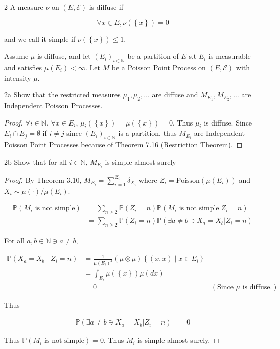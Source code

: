 \documentclass{article}
\newcommand*{\empset}{\emptyset}
\newcommand{\PR}{\mathbb{P}}
\newcommand{\N}{\mathbb{N}}
\newcommand{\Ec}[0]{\mathcal{E}}
\newcommand{\Poi}[0]{\text{Poisson}}
\begin{document}
\begin{PROB}{2}\label{Problem 2.}
    A measure $\nu$ on $(E, \Ec)$ is diffuse if 
    
    \[\forall x\in E, \nu(\left\{ x \right\}) = 0\]

    and we call it simple if $\nu(\left\{ x \right\}) \leq 1$. 

    Assume $\mu$ is diffuse, and let $(E_i)_{i \in \N}$ be a partition of $E$ s.t $E_i$ is measurable and satisfies $\mu(E_i) < \infty$. Let $M$ be a Poisson Point Process on $(E, \Ec)$ with intensity $\mu$. 
\end{PROB}
\begin{claim}{2a}\label{Claim 2a.}
    Show that the restricted measures $\mu_1, \mu_2, \dots$ are diffuse and $M_{E_1}, M_{E_2}, \dots$ are Independent Poisson Processes.  
\end{claim}
\begin{proof}
    $\forall i \in \N$, $\forall x \in E_i$, $\mu_i(\left\{ x \right\}) = \mu(\left\{ x \right\}) = 0$. Thus $\mu_i$ is diffuse. Since $E_i \cap E_j = \empset$ if $i \neq j$ since $(E_i)_{i \in \N}$ is a partition, thus $M_{E_i}$ are Independent Poisson Point Processes because of Theorem 7.16 (Restriction Theorem).        
\end{proof}
\begin{claim}{2b}\label{Claim 2b.}
    Show that for all $i \in \N$, $M_{E_i}$ is simple almost surely   
\end{claim}
\begin{proof}
    By Theorem 3.10, $M_{E_i} = \sum_{i = 1}^{Z_i} \delta_{X_i}$ where $Z_i = \Poi(\mu(E_i))$ and $X_i \sim \mu(\cdot) / \mu(E_i)$. 

    \begin{align*}
        \PR(M_i \text{ is not simple}) &= \sum_{n \geq 2} \PR(Z_i = n) \PR(M_i \text{ is not simple} | Z_i = n) \\
        &= \sum_{n \geq 2} \PR(Z_i = n) \PR(\exists a \neq b \ni X_a = X_b | Z_i = n)
    \end{align*}

    For all $a, b \in \N \ni a \neq b$, 
    
    \begin{align*}
        \PR(X_a = X_b \mid Z_i = n) &= \frac{1}{\mu(E_i)^2}(\mu \otimes \mu)\left\{ (x, x) \mid x \in E_i \right\} \\ 
        &= \int_{E_i} \mu(\left\{ x \right\}) \mu(dx) \\
        &= 0 & (\text{Since } \mu \text{ is diffuse.})
    \end{align*}

    Thus 

    \begin{align*}
        \PR(\exists a \neq b \ni X_a = X_b | Z_i = n) &= 0
    \end{align*}

    Thus $\PR(M_i \text{ is not simple}) = 0$. Thus $M_i$ is simple almost surely.   
\end{proof}
\end{document}
